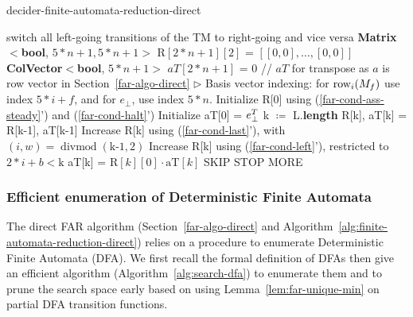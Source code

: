 \begin{algorithm}
    \caption{{\sc decider-finite-automata-reduction-direct}}\label{alg:finite-automata-reduction-direct}

    \begin{algorithmic}[1]
         switch all left-going transitions of the TM to right-going and vice versa
        \EndIf
        \State \textbf{Matrix$\boldsymbol<$bool}, $5*n+1, 5*n+1${}$\boldsymbol>$ $\textrm{R}[2*n+1][2]$ = $[[0,0],\ldots,[0,0]]$
        \State \textbf{ColVector$\boldsymbol<$bool}, $5*n+1${}$\boldsymbol>$ $aT[2*n+1]$ = 0 // $aT$ for transpose as $a$ is row vector in Section~\ref{far-algo-direct}
        \State \(\triangleright\) Basis vector indexing: for $\text{row}_i(M_f)$ use index $5*i+f$, and for $e_\bot$, use index $5*n$.
        \State Initialize R[0] using (\ref{far-cond-ass-steady}') and (\ref{far-cond-halt}')
        \State Initialize aT[0] = $e_\bot^T$
        \State k $\coloneqq$ L.\textbf{length}
        \State R[k], aT[k] = R[k-1], aT[k-1]
        \State Increase R[k] using (\ref{far-cond-last}'), with $(i,w)=\operatorname{divmod}(\textrm{k-1}, 2)$
        \Repeat
        \State Increase R[k] using (\ref{far-cond-left}'), restricted to $2*i+b<\textrm{k}$
        \Repeat
        \State aT[k] = $\textrm{R}[k][0] \cdot \textrm{aT}[k]$
        \Return SKIP
        \Return STOP
        \Else\;\Return MORE
        \EndIf
        \EndProcedure
        \State \Return {}
        \EndProcedure
    \end{algorithmic}
\end{algorithm}

\subsubsection{Efficient enumeration of Deterministic Finite Automata}
\label{far-defs-dfa}
The direct FAR algorithm (Section~\ref{far-algo-direct} and Algorithm~\ref{alg:finite-automata-reduction-direct}) relies on a procedure to enumerate Deterministic Finite Automata (DFA). We first recall the formal definition of DFAs then give an efficient algorithm (Algorithm~\ref{alg:search-dfa}) to enumerate them and to prune the search space early based on using Lemma~\ref{lem:far-unique-min} on partial DFA transition functions.

